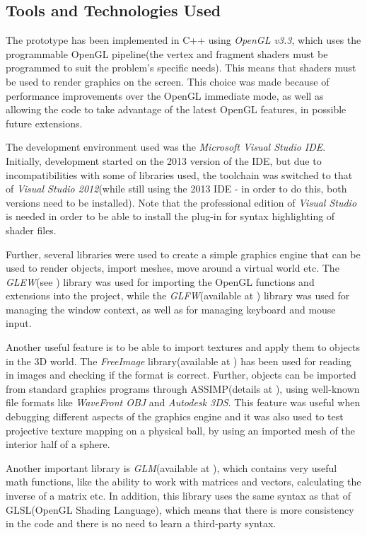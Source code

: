 \documentclass[]{article}
\begin{document}
\subsection{Tools and Technologies Used}

The prototype has been implemented in C++ using \textit{OpenGL v3.3}, which uses the programmable OpenGL pipeline(the vertex and fragment shaders must be programmed to suit the problem's specific needs). This means that shaders must be used to render graphics on the screen. This choice was made because of performance improvements over the OpenGL immediate mode, as well as allowing the code to take advantage of the latest OpenGL features, in possible future extensions.

The development environment used was the \textit{Microsoft Visual Studio IDE}. Initially, development started on the 2013 version of the IDE, but due to incompatibilities with some of libraries used, the toolchain was switched to that of \textit{Visual Studio 2012}(while still using the 2013 IDE - in order to do this, both versions need to be installed). Note that the professional edition of \textit{Visual Studio} is needed in order to be able to install the plug-in for syntax highlighting of shader files.

Further, several libraries were used to create a simple graphics engine that can be used to render objects, import meshes, move around a virtual world etc. The \textit{GLEW}(see \cite{glew}) library was used for importing the OpenGL functions and extensions into the project, while the \textit{GLFW}(available at \cite{glfw}) library was used for managing the window context, as well as for managing keyboard and mouse input.

Another useful feature is to be able to import textures and apply them to objects in the 3D world. The \textit{FreeImage} library(available at \cite{freeimage}) has been used for reading in images and checking if the format is correct. Further, objects can be imported from standard graphics programs through ASSIMP(details at \cite{assimp}), using well-known file formats like \textit{WaveFront OBJ} and \textit{Autodesk 3DS}. This feature was useful when debugging different aspects of the graphics engine and it was also used to test projective texture mapping on a physical ball, by using an imported mesh of the interior half of a sphere.

Another important library is \textit{GLM}(available at \cite{GLM}), which contains very useful math functions, like the ability to work with matrices and vectors, calculating the inverse of a matrix etc. In addition, this library uses the same syntax as that of GLSL(OpenGL Shading Language), which means that there is more consistency in the code and there is no need to learn a third-party syntax.
\end{document}
